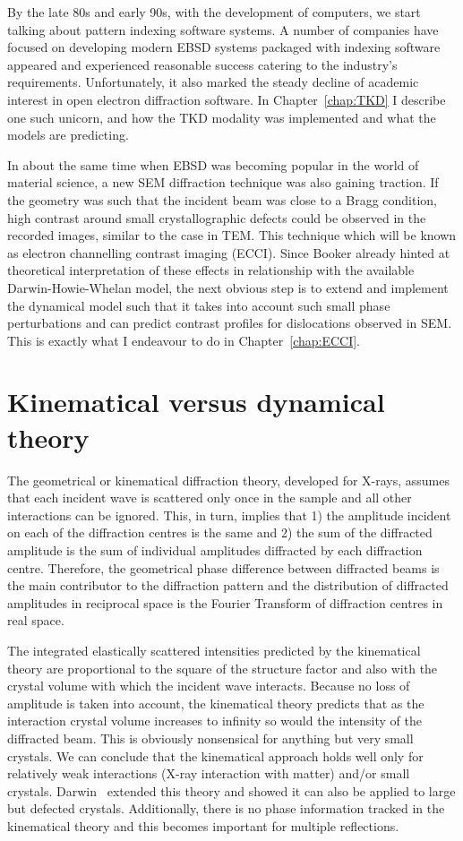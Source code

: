 By the late 80s and early 90s, with the development of computers,  we start talking about  pattern indexing software systems. A number of companies have focused on developing modern EBSD systems packaged with indexing software appeared and experienced reasonable success catering to the industry's requirements. Unfortunately, it also marked the steady decline of academic interest in open electron diffraction software. In Chapter~\ref{chap:TKD} I describe one such unicorn, and how the TKD modality was implemented and what the models are predicting. 


In about the same time when EBSD was becoming popular in the world of material science, a new SEM diffraction technique was also gaining traction. If the geometry was such that the incident beam was close to a Bragg condition, high contrast around small crystallographic defects could be observed in the recorded images, similar to the case in TEM. This technique which will be known as electron channelling contrast imaging (ECCI). Since Booker already hinted at theoretical interpretation of these effects in relationship with the available Darwin-Howie-Whelan model, the next obvious step is  to extend and implement the dynamical model such that it takes into account such small phase perturbations and can predict contrast profiles for dislocations observed in SEM. This is exactly what I endeavour to do in  Chapter~\ref{chap:ECCI}. 




\section{Kinematical versus dynamical theory}
\label{sec:kinvsDyn}
The geometrical or kinematical diffraction theory, developed for X-rays, assumes that each incident wave is scattered only once in the sample and all other interactions can be ignored. This, in turn, implies that  1) the amplitude incident on each of the diffraction centres is the same and 2) the sum of the diffracted amplitude is the sum of individual amplitudes diffracted by each diffraction centre. Therefore, the geometrical phase difference between diffracted beams is the main contributor to the diffraction pattern and the distribution of diffracted amplitudes in reciprocal space is the Fourier Transform of diffraction centres in real space.  

The integrated elastically scattered intensities predicted by the kinematical theory are proportional to the square of the structure factor and also with the crystal volume with which the incident wave interacts. Because no loss of amplitude is taken into account, the kinematical theory predicts that as the interaction crystal volume increases to infinity so would the intensity of the diffracted beam. This is obviously nonsensical for anything but very small crystals. We can conclude that the kinematical approach holds well only for relatively weak interactions (X-ray interaction with matter) and/or small crystals. Darwin~\cite{Darwin22} extended this theory and showed it can also be applied to large but defected crystals. Additionally, there is no phase information tracked in the kinematical theory and this becomes important for multiple reflections. 
 
